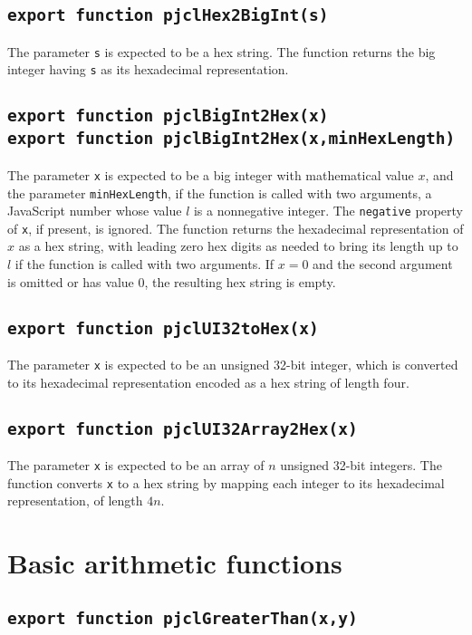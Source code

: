 \documentclass[12pt]{article}
\begin{document}
\subsection{\tt export function pjclHex2BigInt(s)}

The parameter {\tt s} is expected to be a hex string.  The function
returns the big integer having {\tt s} as its hexadecimal representation.

\subsection{\tt export function pjclBigInt2Hex(x)\\export function pjclBigInt2Hex(x,minHexLength)}

The parameter {\tt x} is expected to be a big integer with mathematical value $x$,
and the parameter {\tt minHexLength}, if the function is called with two
arguments, a JavaScript number whose value $l$ is a nonnegative integer.
The {\tt negative} property of {\tt x}, if present, is ignored.
The function returns the hexadecimal representation of $x$ as a hex string,
with leading zero hex digits as needed to bring its length up to $l$ if
the function is called with two arguments.
If $x = 0$ and the second argument is omitted or has value 0, the resulting hex string is empty.

\subsection{\tt export function pjclUI32toHex(x)}

The parameter {\tt x} is expected to be an unsigned 32-bit integer, which is
converted to its hexadecimal representation encoded as a hex string of length four.

\subsection{\tt export function pjclUI32Array2Hex(x)}

The parameter {\tt x} is expected to be an array of $n$
unsigned 32-bit integers.  The function converts {\tt x} to a hex string by mapping
each integer to its hexadecimal representation, of length $4n$.

\section{Basic arithmetic functions}

\subsection{\tt export function pjclGreaterThan(x,y)}
\end{document}
